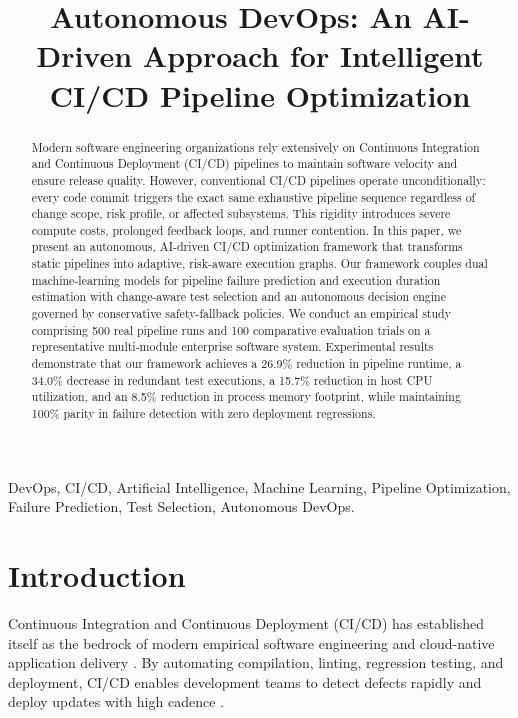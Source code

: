 \documentclass[conference]{IEEEtran}
\begin{document}
\title{Autonomous DevOps: An AI-Driven Approach for Intelligent CI/CD Pipeline Optimization}

\author{
}

\maketitle

\begin{abstract}
Modern software engineering organizations rely extensively on Continuous Integration and Continuous Deployment (CI/CD) pipelines to maintain software velocity and ensure release quality. However, conventional CI/CD pipelines operate unconditionally: every code commit triggers the exact same exhaustive pipeline sequence regardless of change scope, risk profile, or affected subsystems. This rigidity introduces severe compute costs, prolonged feedback loops, and runner contention. In this paper, we present an autonomous, AI-driven CI/CD optimization framework that transforms static pipelines into adaptive, risk-aware execution graphs. Our framework couples dual machine-learning models for pipeline failure prediction and execution duration estimation with change-aware test selection and an autonomous decision engine governed by conservative safety-fallback policies. We conduct an empirical study comprising 500 real pipeline runs and 100 comparative evaluation trials on a representative multi-module enterprise software system. Experimental results demonstrate that our framework achieves a 26.9\% reduction in pipeline runtime, a 34.0\% decrease in redundant test executions, a 15.7\% reduction in host CPU utilization, and an 8.5\% reduction in process memory footprint, while maintaining 100\% parity in failure detection with zero deployment regressions.
\end{abstract}

\begin{IEEEkeywords}
DevOps, CI/CD, Artificial Intelligence, Machine Learning, Pipeline Optimization, Failure Prediction, Test Selection, Autonomous DevOps.
\end{IEEEkeywords}

\section{Introduction}
Continuous Integration and Continuous Deployment (CI/CD) has established itself as the bedrock of modern empirical software engineering and cloud-native application delivery \cite{beller2017travistorrent, gallaba2018use}. By automating compilation, linting, regression testing, and deployment, CI/CD enables development teams to detect defects rapidly and deploy updates with high cadence \cite{zhao2017impact}.
\end{document}
